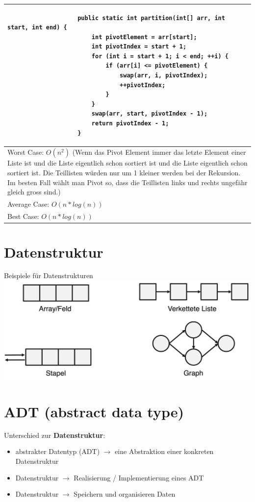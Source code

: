 \documentclass[a4paper, landscape, 8pt]{scrartcl}
\begin{document}
\begin{multicols*}{4}
\begin{tabular}{|p{6.55cm}|}
\begin{lstlisting}
                    public static int partition(int[] arr, int start, int end) {
                        int pivotElement = arr[start];
                        int pivotIndex = start + 1;
                        for (int i = start + 1; i < end; ++i) {
                            if (arr[i] <= pivotElement) {
                                swap(arr, i, pivotIndex);
                                ++pivotIndex;
                            }
                        }
                        swap(arr, start, pivotIndex - 1);
                        return pivotIndex - 1;
                    }
                    \end{lstlisting} \\
                    \hline
                    Worst Case: $O(n^2)$ (Wenn das Pivot Element immer das letzte Element einer Liste ist und die Liste
                    eigentlich schon sortiert ist und die Liste eigentlich schon sortiert ist. Die Teillisten würden
                    nur um 1 kleiner werden bei der Rekursion. Im besten Fall wählt man Pivot so, dass die Teillisten
                    links und rechts ungefähr gleich gross sind.) \\
                    Average Case: $O(n*log(n))$ \\
                    Best Case: $O(n*log(n))$ \\
                    \hline
                \end{tabular}

            \section{Datenstruktur}
                \textcolor{subsectioncolor}{Beispiele für Datenstrukturen}
                \newline
                \includegraphics[scale=0.12]{graphic/06_adt_beispiele}


            \section{ADT (abstract data type)}
            Unterschied zur {\bfseries Datenstruktur}:
            \begin{itemize}
                \item abstrakter Datentyp (ADT) $\to$ eine Abstraktion einer konkreten Datenstruktur
                \item Datenstruktur $\to$ Realisierung / Implementierung eines ADT
                \item Datenstruktur $\to$ Speichern und organisieren Daten
            \end{itemize}

\end{multicols*}
\end{document}

